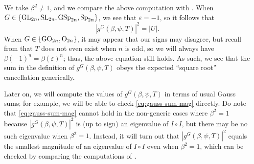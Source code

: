 \begin{remark}
	We take $\beta^2\ne1$, and we compare the above computation with . When $G\in\{\mathrm{GL}_{2n},\mathrm{SL}_{2n},\mathrm{GSp}_{2n},\mathrm{Sp}_{2n}\}$, we see that $\varepsilon=-1$, so it follows that
	\begin{equation}
		\left|g^G(\beta,\psi,T)\right|^2=\left|U\right|. \label{eq:gauss-sum-mag}
	\end{equation}
	When $G\in\{\mathrm{GO}_{2n},\mathrm{O}_{2n}\}$, it may appear that our signs may disagree, but recall from  that $T$ does not even exist when $n$ is odd, so we will always have $\beta(-1)^n=\beta(\varepsilon)^n$; thus, the above equation still holds. As such, we see that the sum in the definition of $g^G(\beta,\psi,T)$ obeys the expected ``square root'' cancellation generically.
\end{remark}
\begin{remark}
	Later on, we will compute the values of $g^G(\beta,\psi,T)$ in terms of usual Gauss sums; for example, we will be able to check \eqref{eq:gauss-sum-mag} directly. Do note that \eqref{eq:gauss-sum-mag} cannot hold in the non-generic cases where $\beta^2=1$ because $\left|g^G(\beta,\psi,T)\right|^2$ is (up to sign) an eigenvalue of $I\circ I$, but there may be no such eigenvalue when $\beta^2=1$. Instead, it will turn out that $\left|g^G(\beta,\psi,T)\right|^2$ equals the smallest magnitude of an eigenvalue of $I\circ I$ even when $\beta^2=1$, which can be checked by comparing the computations of .
\end{remark}